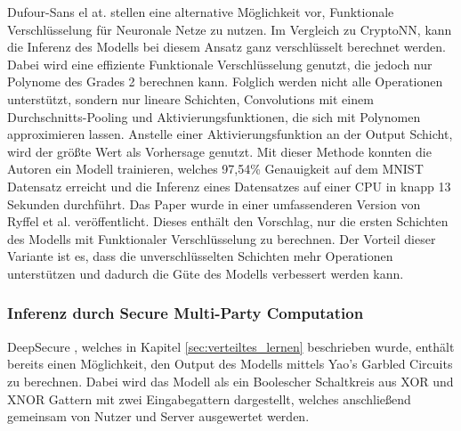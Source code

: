 Dufour-Sans el at. \cite{P-105} stellen eine alternative Möglichkeit vor, Funktionale Verschlüsselung für Neuronale Netze zu nutzen.
Im Vergleich zu CryptoNN, kann die Inferenz des Modells bei diesem Ansatz ganz verschlüsselt berechnet werden.
Dabei wird eine effiziente Funktionale Verschlüsselung genutzt, die jedoch nur Polynome des Grades 2 berechnen kann.
Folglich werden nicht alle Operationen unterstützt, sondern nur lineare Schichten, Convolutions mit einem Durchschnitts-Pooling und Aktivierungsfunktionen, die sich mit Polynomen approximieren lassen.
Anstelle einer Aktivierungsfunktion an der Output Schicht, wird der größte Wert als Vorhersage genutzt.
Mit dieser Methode konnten die Autoren ein Modell trainieren, welches 97,54\% Genauigkeit auf dem MNIST Datensatz \cite{D-MNIST} erreicht und die Inferenz eines Datensatzes auf einer CPU in knapp 13 Sekunden durchführt.
Das Paper wurde in einer umfassenderen Version von Ryffel et al. \cite{P-46} veröffentlicht.
Dieses enthält den Vorschlag, nur die ersten Schichten des Modells mit Funktionaler Verschlüsselung zu berechnen. 
Der Vorteil dieser Variante ist es, dass die unverschlüsselten Schichten mehr Operationen unterstützen und dadurch die Güte des Modells verbessert werden kann.

\subsubsection*{Inferenz durch Secure Multi-Party Computation}
DeepSecure \cite{P-71}, welches in Kapitel \ref{sec:verteiltes_lernen} beschrieben wurde, enthält bereits einen Möglichkeit, den Output des Modells mittels Yao's Garbled Circuits zu berechnen.
Dabei wird das Modell als ein Boolescher Schaltkreis aus XOR und XNOR Gattern mit zwei Eingabegattern dargestellt, welches anschließend gemeinsam von Nutzer und Server ausgewertet werden.

